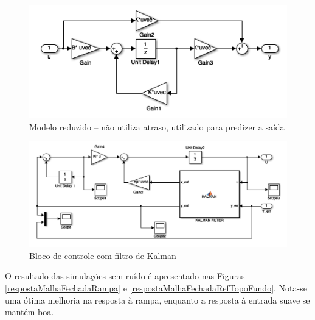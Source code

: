 \begin{figure}[!ht]
\centering
\caption{Modelo reduzido -- não utiliza atraso, utilizado para predizer a saída\label{blocoModeloReduzido}}
\includegraphics[width=0.6\linewidth]{figs/resultados/simulink/modeloReduzido}
\end{figure}

\begin{figure}[!ht]
\centering
\caption{Bloco de controle com filtro de Kalman\label{blocoControle}}
\includegraphics[width=0.9\linewidth]{figs/resultados/simulink/controle}
\end{figure}

 O resultado das simulações sem ruído é apresentado nas Figuras \ref{respostaMalhaFechadaRampa} e \ref{respostaMalhaFechadaRefTopoFundo}. Nota-se uma ótima melhoria na resposta à rampa, enquanto a resposta à entrada suave se mantém boa.


